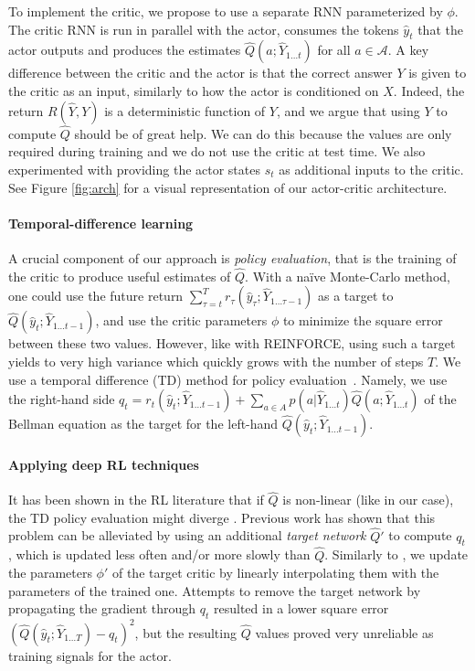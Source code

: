 \documentclass{article} \usepackage{iclr2017_conference,times}
\begin{document}
To implement the critic, we propose to use a separate RNN parameterized by $\phi$.
The critic RNN is run
 in parallel with the actor, consumes the tokens $\hat{y}_t$
that the actor outputs and
 produces the estimates $\hat{Q}(a;\hat{Y}_{1
\ldots t})$ for all $a \in \mathcal{A}$. 
 A key difference between the critic
and the actor is that the
 correct answer $Y$ is given to the critic as an
input, similarly to how the actor
 is conditioned on $X$. Indeed, the return
$R(\hat{Y}, Y)$ is a deterministic
 function of $Y$, and we argue that using
$Y$ to compute $\hat{Q}$ should be of
 great help.  We can do this because the
values are only required during training and we do not use the critic at test
time.  We also experimented with providing the actor states $s_t$ as additional
 inputs to the critic.
 See Figure \ref{fig:arch} for a visual
representation of our actor-critic architecture.


\paragraph{Temporal-difference learning}
A crucial component of our approach is \emph{policy evaluation}, that is the training of the critic
to produce useful estimates of $\hat{Q}$. With a na{\"i}ve Monte-Carlo method, one could use the future
return $\sum_{\tau=t}^T r_{\tau}(\hat{y}_{\tau}; \hat{Y}_{1 \ldots \tau
- 1})$ as a target to $\hat{Q}(\hat{y}_t; \hat{Y}_{1 \ldots t - 1})$, and use the
critic parameters $\phi$ to minimize the square error between these two values.
However, like with REINFORCE, using such a target yields to
very high variance which quickly grows with the number
of steps $T$.
We use a temporal difference (TD) method for policy
evaluation~\citep{sutton1988learning}. Namely, we use the right-hand side 
$q_t=r_t(\hat{y}_t;\hat{Y}_{1 \ldots t - 1}) + \sum_{a \in A}
p(a|\hat{Y}_{1 \ldots t}) \hat{Q}(a;\hat{Y}_{1 \ldots t})$ of the Bellman equation as the
target for the left-hand $\hat{Q}(\hat{y}_t; \hat{Y}_{1 \ldots t - 1})$.




\paragraph{Applying deep RL techniques}

It has been shown in the RL literature that if $\hat{Q}$ is non-linear (like 
in our case), the TD policy evaluation might diverge \citep{tsitsiklis1997analysis}.
Previous work has shown that this problem can be alleviated by using an additional
\emph{target network}
$\hat{Q}'$ to compute $q_t$, which is updated less often and/or more slowly than $\hat{Q}$. 
Similarly to \citep{lillicrap2015continuous}, we update the parameters $\phi'$
of the target critic by linearly interpolating them with the parameters of the trained
one.
Attempts to remove the target network by propagating the gradient through $q_t$ 
resulted in a lower square error 
$(\hat{Q}(\hat{y}_t;  \hat{Y}_{1 \ldots T}) - q_t)^2$, but the resulting $\hat{Q}$ 
values proved very unreliable as training signals for the actor.
\end{document}

